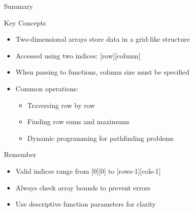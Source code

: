 \documentclass{beamer}
\begin{document}
\begin{frame}{Summary}
    \begin{block}{Key Concepts}
        \begin{itemize}
            \item Two-dimensional arrays store data in a grid-like structure
            \item Accessed using two indices: [row][column]
            \item When passing to functions, column size must be specified
            \item Common operations:
            \begin{itemize}
                \item Traversing row by row
                \item Finding row sums and maximums
                \item Dynamic programming for pathfinding problems
            \end{itemize}
        \end{itemize}
    \end{block}
    
    \begin{alertblock}{Remember}
        \begin{itemize}
            \item Valid indices range from [0][0] to [rows-1][cols-1]
            \item Always check array bounds to prevent errors
            \item Use descriptive function parameters for clarity
        \end{itemize}
    \end{alertblock}
\end{frame}
\end{document}
